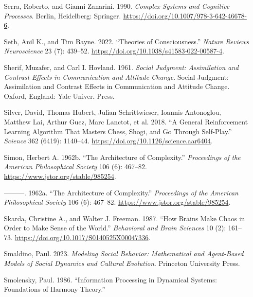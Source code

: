 \documentclass[
  a4paper,
  DIV=11,
  numbers=noendperiod,
  oneside]{scrreprt}
\newlength{\cslhangindent}
\newlength{\cslentryspacingunit} %
\newenvironment{CSLReferences}[2] %
 {%
  \setlength{\parindent}{0pt}
  \ifodd #1
  \let\oldpar\par
  \def\par{\hangindent=\cslhangindent\oldpar}
  \fi
  \setlength{\parskip}{#2\cslentryspacingunit}
 }%
 {}
\begin{document}
\begin{CSLReferences}{1}{0}
\leavevmode{}%
Serra, Roberto, and Gianni Zanarini. 1990. \emph{Complex {Systems} and
{Cognitive Processes}}. {Berlin, Heidelberg}: {Springer}.
\url{https://doi.org/10.1007/978-3-642-46678-6}.

\leavevmode{}%
Seth, Anil K., and Tim Bayne. 2022. {``Theories of Consciousness.''}
\emph{Nature Reviews Neuroscience} 23 (7): 439--52.
\url{https://doi.org/10.1038/s41583-022-00587-4}.

\leavevmode{}%
Sherif, Muzafer, and Carl I. Hovland. 1961. \emph{Social Judgment:
{Assimilation} and Contrast Effects in Communication and Attitude
Change}. Social Judgment: {Assimilation} and Contrast Effects in
Communication and Attitude Change. {Oxford, England}: {Yale Univer.
Press}.

\leavevmode{}%
Silver, David, Thomas Hubert, Julian Schrittwieser, Ioannis Antonoglou,
Matthew Lai, Arthur Guez, Marc Lanctot, et al. 2018. {``A General
Reinforcement Learning Algorithm That Masters Chess, Shogi, and {Go}
Through Self-Play.''} \emph{Science} 362 (6419): 1140--44.
\url{https://doi.org/10.1126/science.aar6404}.

\leavevmode{}%
Simon, Herbert A. 1962b. {``The {Architecture} of {Complexity}.''}
\emph{Proceedings of the American Philosophical Society} 106 (6):
467--82. \url{https://www.jstor.org/stable/985254}.

\leavevmode{}%
---------. 1962a. {``The Architecture of Complexity.''}
\emph{Proceedings of the American Philosophical Society} 106 (6):
467--82. \url{https://www.jstor.org/stable/985254}.

\leavevmode{}%
Skarda, Christine A., and Walter J. Freeman. 1987. {``How Brains Make
Chaos in Order to Make Sense of the World.''} \emph{Behavioral and Brain
Sciences} 10 (2): 161--73.
\url{https://doi.org/10.1017/S0140525X00047336}.

\leavevmode{}%
Smaldino, Paul. 2023. \emph{Modeling Social Behavior: Mathematical and
Agent-Based Models of Social Dynamics and Cultural Evolution}. Princeton
University Press.

\leavevmode{}%
Smolensky, Paul. 1986. {``Information {Processing} in {Dynamical
Systems}: {Foundations} of {Harmony Theory}.''}


\end{CSLReferences}
\end{document}
